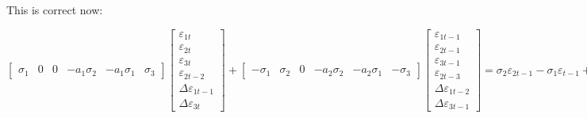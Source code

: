 \documentclass[a4paper,12pt]{article}
\begin{document}
\bigskip 

\bigskip 

\bigskip 


This is correct now:

$%
\begin{bmatrix}
\sigma _{1} & 0 & 0 & -a_{1}\sigma _{2} & -a_{1}\sigma _{1} & \sigma _{3}%
\end{bmatrix}%
\begin{bmatrix}
\varepsilon _{1t} \\ 
\varepsilon _{2t} \\ 
\varepsilon _{3t} \\ 
\varepsilon _{2t-2} \\ 
\Delta \varepsilon _{1t-1} \\ 
\Delta \varepsilon _{3t}%
\end{bmatrix}%
+%
\begin{bmatrix}
-\sigma _{1} & \sigma _{2} & 0 & -a_{2}\sigma _{2} & -a_{2}\sigma _{1} & 
-\sigma _{3}%
\end{bmatrix}%
\begin{bmatrix}
\varepsilon _{1t-1} \\ 
\varepsilon _{2t-1} \\ 
\varepsilon _{3t-1} \\ 
\varepsilon _{2t-3} \\ 
\Delta \varepsilon _{1t-2} \\ 
\Delta \varepsilon _{3t-1}%
\end{bmatrix}%
=\allowbreak \sigma _{2}\varepsilon _{2t-1}-\sigma _{1}\varepsilon
_{t-1}+\sigma _{1}\varepsilon _{t}+\Delta \sigma _{3}\varepsilon
_{3t}-\Delta \sigma _{3}\varepsilon _{3t-1}-\sigma _{2}a_{1}\varepsilon
_{2t-2}-\sigma _{2}a_{2}\varepsilon _{2t-3}-\Delta \sigma
_{1}a_{1}\varepsilon _{t-1}-\Delta \sigma _{1}a_{2}\varepsilon
_{t-2}\allowbreak $

\EAW

\bigskip 
\end{document}
